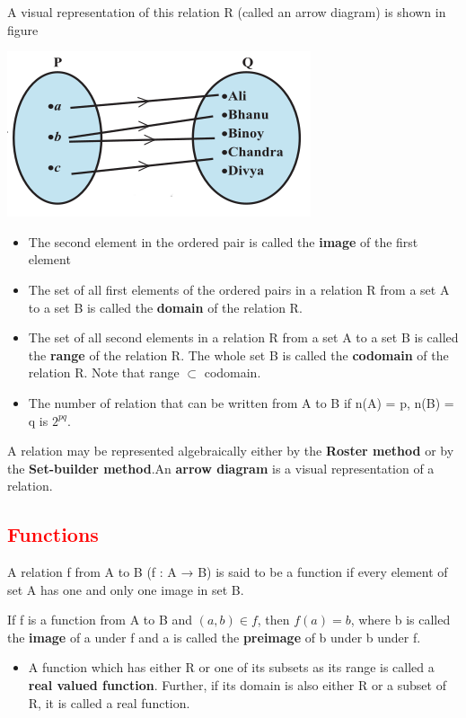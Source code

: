 \documentclass{article}
\begin{document}
\begin{multicols}{2}
A visual representation of this relation R (called an arrow diagram) is shown in figure 

\includegraphics[scale=0.5]{1.png}

\begin{itemize}
    \item The second
element in the ordered pair is called the \textbf{image} of the first element
\item The set of all first elements of the ordered pairs in a relation R from a set
A to a set B is called the \textbf{domain} of the relation R.
\item The set of all second elements in a relation R from a set A to a set B is
called the \textbf{range} of the relation R. The whole set B is called the \textbf{codomain} of the
relation R. Note that range $\subset$ codomain.
\item The number of relation that can be written from A to B if n(A) = p, n(B) = q is $2^{pq}$.
\end{itemize}


A relation may be represented algebraically either by the \textbf{Roster
method} or by the \textbf{Set-builder method}.An \textbf{arrow diagram} is a visual representation of a relation.
  
\subsection*{\textcolor{red}{Functions}}
A relation f from A to B (f : A → B) is said to be a function if every element of set A has one and only one image in set B.

If f is a function from A to B and $(a, b) \in f$, then $f(a) = b$, where b is called the
\textbf{image} of a under f and a is called the \textbf{preimage} of b under b under f.

\begin{itemize}
    \item A function which has either R or one of its subsets as its range is called
a \textbf{real valued function}. Further, if its domain is also either R or a subset of R, it is
called a {real function}.
\end{itemize}


\end{multicols}
\end{document}
